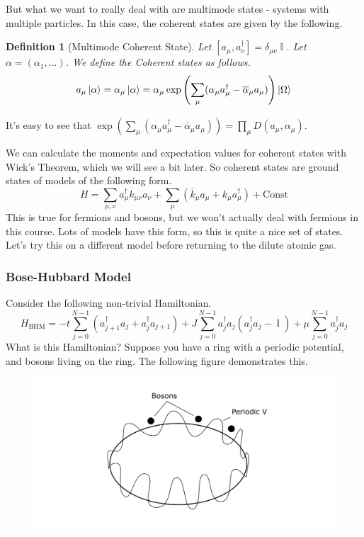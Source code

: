 \documentclass{article}
\DeclareMathOperator{\II}{\mathbb{I}}
\newtheorem{defn}{Definition}
\begin{document}
But what we want to really deal with are multimode states - systems with multiple particles. In this case, the coherent states are given by the following. 
\begin{defn}[Multimode Coherent State] Let $[a_\mu,a_\nu^\dagger]=\delta_{\mu\nu}\II$. Let $\alpha = (\alpha_1,...)$. We define the Coherent states as follows.
\begin{equation}
a_\mu\ket{\alpha} = \alpha_\mu\ket{\alpha} = \alpha_\mu \exp\left(\sum_{\mu} (\alpha_\mu a_\mu^\dagger - \overline\alpha_\mu a_\mu)\right)\ket{\Omega}
\end{equation}
\end{defn}
It's easy to see that $ \exp\left(\sum_{\mu} (\alpha_\mu a_\mu^\dagger - \overline\alpha_\mu a_\mu)\right) = \prod_\mu D(a_\mu,\alpha_\mu)$.

We can calculate the moments and expectation values for coherent states with Wick's Theorem, which we will see a bit later.  So coherent states are ground states of models of the following form.
\begin{equation}
H=\sum_{\mu,\nu}a_\mu^\dagger k_{\mu\nu}a_\nu + \sum_{\mu}\left(\overline k_\mu a_\mu + k_\mu a_\mu^\dagger\right) + \textrm{Const}
\end{equation}
This is true for fermions and bosons, but we won't actually deal with fermions in this course. Lots of models have this form, so this is quite a nice set of states. Let's try this on a different model before returning to the dilute atomic gas. 
\subsubsection{Bose-Hubbard Model}
Consider the following non-trivial Hamiltonian.
\begin{equation}
H_{\textrm{BHM}} = -t \sum_{j=0}^{N-1}( a_{j+1}^\dagger a_j + a_j^\dagger a_{j+1}) + J\sum_{j=0}^{N-1}a_j^\dagger a_j(a_j^\dagger a_j - \II) + \mu\sum_{j=0}^{N-1}a_j^\dagger a_j
\end{equation}
What is this Hamiltonian? Suppose you have a ring with a periodic potential, and bosons living on the ring. The following figure demonstrates this. 
\begin{figure}[ht]
    \centering
    \includegraphics[width=\linewidth]{Figures/bose_hubbard.png}
    \caption*{}
    \label{fig:bhub}
\end{figure}
\end{document}
